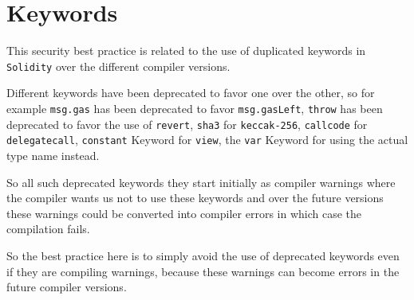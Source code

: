 \section{Keywords}\label{keywords}

This security best practice is related to the use of duplicated keywords
in \texttt{Solidity} over the different compiler versions.

Different keywords have been deprecated to favor one over the other, so
for example \texttt{msg.gas} has been deprecated to favor
\texttt{msg.gasLeft}, \texttt{throw} has been deprecated to favor the
use of \texttt{revert}, \texttt{sha3} for \texttt{keccak-256},
\texttt{callcode} for \texttt{delegatecall}, \texttt{constant} Keyword
for \texttt{view}, the \texttt{var} Keyword for using the actual type
name instead.

So all such deprecated keywords they start initially as compiler
warnings where the compiler wants us not to use these keywords and over
the future versions these warnings could be converted into compiler
errors in which case the compilation fails.

So the best practice here is to simply avoid the use of deprecated
keywords even if they are compiling warnings, because these warnings can
become errors in the future compiler versions.
